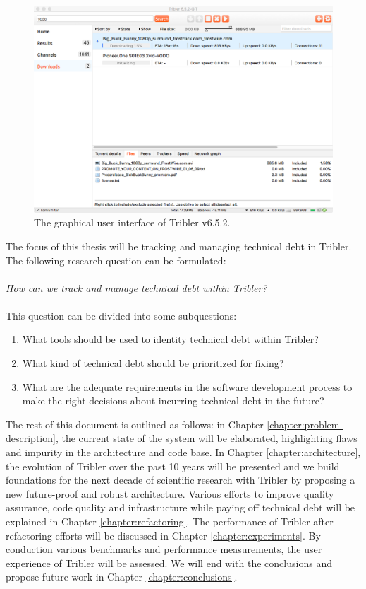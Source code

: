 \begin{figure}[!h]
	\centering
	\includegraphics[width=0.9\columnwidth]{images/tribler_interface}
	\caption{The graphical user interface of Tribler v6.5.2.}
	\label{fig:tribler-interface}
\end{figure}

\newpage

The focus of this thesis will be tracking and managing technical debt in Tribler. The following research question can be formulated:\\\\
\emph{How can we track and manage technical debt within Tribler?}\\\\
This question can be divided into some subquestions:
\begin{enumerate}
	\item What tools should be used to identity technical debt within Tribler?
	\item What kind of technical debt should be prioritized for fixing?
	\item What are the adequate requirements in the software development process to make the right decisions about incurring technical debt in the future?
\end{enumerate}

The rest of this document is outlined as follows: in Chapter \ref{chapter:problem-description}, the current state of the system will be elaborated, highlighting flaws and impurity in the architecture and code base. 
In Chapter \ref{chapter:architecture}, the evolution of Tribler over the past 10 years will be presented and we build foundations for the next decade of scientific research with Tribler by proposing a new future-proof and robust architecture.
Various efforts to improve quality assurance, code quality and infrastructure while paying off technical debt will be explained in Chapter \ref{chapter:refactoring}.
The performance of Tribler after refactoring efforts will be discussed in Chapter \ref{chapter:experiments}.
By conduction various benchmarks and performance measurements, the user experience of Tribler will be assessed.
We will end with the conclusions and propose future work in Chapter \ref{chapter:conclusions}.

